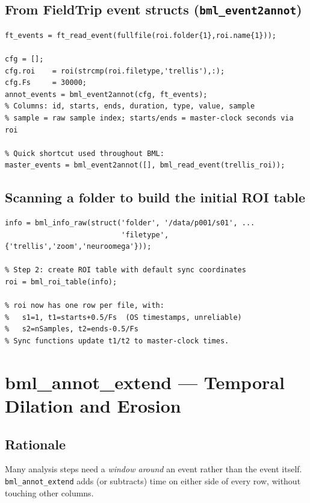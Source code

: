 \documentclass[11pt, a4paper]{article}
\begin{document}
\subsection{From FieldTrip event structs (\texttt{bml\_event2annot})}

\begin{lstlisting}[style=matlab]
% Read Ripple (Trellis) events
ft_events = ft_read_event(fullfile(roi.folder{1},roi.name{1}));

cfg = [];
cfg.roi    = roi(strcmp(roi.filetype,'trellis'),:);
cfg.Fs     = 30000;
annot_events = bml_event2annot(cfg, ft_events);
% Columns: id, starts, ends, duration, type, value, sample
% sample = raw sample index; starts/ends = master-clock seconds via roi

% Quick shortcut used throughout BML:
master_events = bml_event2annot([], bml_read_event(trellis_roi));
\end{lstlisting}

\subsection{Scanning a folder to build the initial ROI table}

\begin{lstlisting}[style=matlab]
% Step 1: scan folder, infer file type from extension/name pattern
info = bml_info_raw(struct('folder', '/data/p001/s01', ...
                           'filetype', {'trellis','zoom','neuroomega'}));

% Step 2: create ROI table with default sync coordinates
roi = bml_roi_table(info);

% roi now has one row per file, with:
%   s1=1, t1=starts+0.5/Fs  (OS timestamps, unreliable)
%   s2=nSamples, t2=ends-0.5/Fs
% Sync functions update t1/t2 to master-clock times.
\end{lstlisting}

\section{bml\_annot\_extend --- Temporal Dilation and Erosion}
\label{sec:extend}

\subsection{Rationale}

Many analysis steps need a \emph{window around} an event rather than the event itself. \texttt{bml\_annot\_extend} adds (or subtracts) time on either side of every row, without touching other columns.
\end{document}
